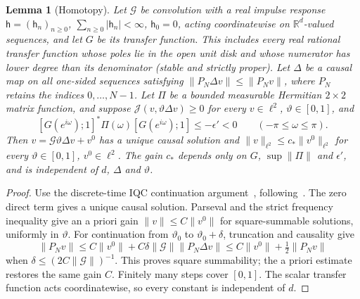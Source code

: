 \documentclass[11pt]{article}
\newtheorem{lemma}[theorem]{Lemma}
\theoremstyle{definition}
\theoremstyle{remark}
\newcommand{\R}{\mathbb R}
\newcommand{\norm}[1]{\lVert #1\rVert}
\begin{document}
\begin{lemma}[Homotopy]\label{lem:homotopy}
Let \(\mathcal G\) be convolution with a real impulse response \(\mathsf h=(\mathsf h_n)_{n\ge0}\),
\(\sum_{n\ge0}|\mathsf h_n|<\infty\), \(\mathsf h_0=0\), acting coordinatewise on
\(\R^d\)-valued sequences, and let \(G\) be its transfer function.  This includes every real rational transfer function whose poles lie in the open unit disk and whose numerator has lower degree than its denominator (stable and strictly proper).  Let \(\Delta\) be a causal map on all
one-sided sequences satisfying
\(\norm{P_N\Delta v}\le\norm{P_Nv}\), where \(P_N\) retains the indices
\(0,\ldots,N-1\).  Let \(\Pi\) be a bounded measurable Hermitian \(2\times2\)
matrix function, and suppose
\(\mathcal J(v,\vartheta\Delta v)\ge0\) for every \(v\in\ell^2\),
\(\vartheta\in[0,1]\), and
\[
[G(e^{i\omega});1]^*\Pi(\omega)[G(e^{i\omega});1]
\le-\epsilon'<0\qquad(-\pi\le\omega\le\pi).
\]
Then \(v=\mathcal G\vartheta\Delta v+v^0\) has a unique causal
solution and \(\norm v_{\ell^2}\le c_*\norm{v^0}_{\ell^2}\) for every
\(\vartheta\in[0,1]\), \(v^0\in\ell^2\).  The gain \(c_*\) depends only
on \(G\), \(\sup\norm\Pi\) and \(\epsilon'\), and is independent of
\(d\), \(\Delta\) and \(\vartheta\).
\end{lemma}


\begin{proof}
Use the discrete-time IQC continuation argument~\cite[Lemma~D.5]{TA}, following~\cite[Theorem~1]{MR97}.
The zero direct term gives a unique causal solution.  Parseval and the strict frequency inequality give
an a priori gain \(\norm v\le C\norm{v^0}\) for square-summable solutions, uniformly in \(\vartheta\).
For continuation from \(\vartheta_0\) to \(\vartheta_0+\delta\), truncation and causality give
\[
\norm{P_Nv}\le C\norm{v^0}+C\delta\norm{\mathcal G}\norm{P_N\Delta v}
\le C\norm{v^0}+\tfrac12\norm{P_Nv}
\]
when \(\delta\le(2C\norm{\mathcal G})^{-1}\).
This proves square summability; the a priori estimate restores the same gain \(C\).
Finitely many steps cover \([0,1]\).  The scalar transfer function acts coordinatewise,
so every constant is independent of \(d\).
\end{proof}
\end{document}
